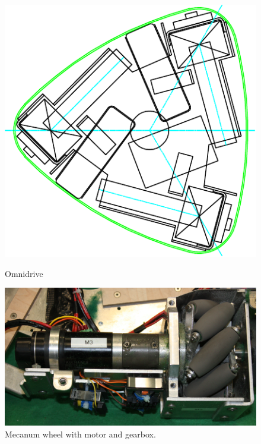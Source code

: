 \documentclass[12pt,a4paper]{article}
\begin{document}
\begin{figure}[hb]
  \begin{minipage}{0.45\textwidth}
   \centering
    \includegraphics[width=1\textwidth]{figures/krikkit_drive}
    \caption{\label{fig:omnidrive}Omnidrive \cite{mecanum2007}}
  \end{minipage}\hfill
  \begin{minipage}{0.45\textwidth}
   \centering
    \includegraphics[width=1\textwidth]{figures/Omniwheel_drive.png}
    \caption{\label{fig:mec-wheel}Mecanum wheel with motor and gearbox.}
  \end{minipage}
\end{figure}
\end{document}
